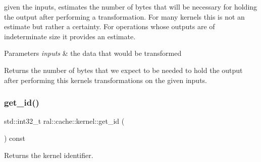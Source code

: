 given the inputs, estimates the number of bytes that will be necessary for holding the output after performing a transformation. For many kernels this is not an estimate but rather a certainty. For operations whose outputs are of indeterminate size it provides an estimate. 


\begin{DoxyParams}{Parameters}
{\em inputs} & the data that would be transformed \\
\hline
\end{DoxyParams}
\begin{DoxyReturn}{Returns}
the number of bytes that we expect to be needed to hold the output after performing this kernels transformations on the given inputs. 
\end{DoxyReturn}
\mbox{\label{classral_1_1cache_1_1kernel_a33ce6e9907abce1acedb01e236c6812e}} 
\subsubsection{\texorpdfstring{get\+\_\+id()}{get\_id()}}
{\footnotesize\ttfamily std\+::int32\+\_\+t ral\+::cache\+::kernel\+::get\+\_\+id (\begin{DoxyParamCaption}{ }\end{DoxyParamCaption}) const\hspace{0.3cm}{\ttfamily [inline]}}



Returns the kernel identifier. 

